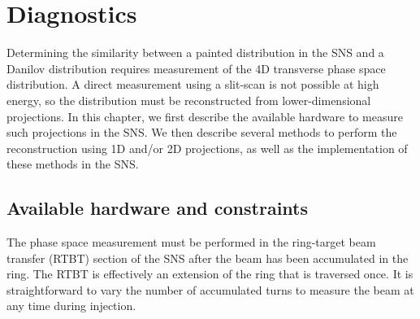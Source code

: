 \chapter{Diagnostics} \label{chap-4}

Determining the similarity between a painted distribution in the SNS and a Danilov distribution requires measurement of the 4D transverse phase space distribution. A direct measurement using a slit-scan \cite{Cathey2018} is not possible at high energy, so the distribution must be reconstructed from lower-dimensional projections. In this chapter, we first describe the available hardware to measure such projections in the SNS. We then describe several methods to perform the reconstruction using 1D and/or 2D projections, as well as the implementation of these methods in the SNS.


\section{Available hardware and constraints}

The phase space measurement must be performed in the ring-target beam transfer (RTBT) section of the SNS after the beam has been accumulated in the ring. The RTBT is effectively an extension of the ring that is traversed once. It is straightforward to vary the number of accumulated turns to measure the beam at any time during injection. 

